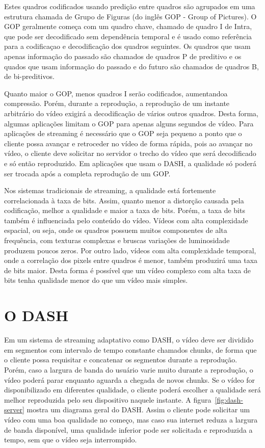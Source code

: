 Estes quadros codificados usando predição entre quadros são agrupados em uma estrutura chamada de Grupo de Figuras (do inglês GOP - Group of Pictures). O GOP geralmente começa com um quadro chave, chamado de quadro I de Intra, que pode ser decodificado sem dependência temporal e é usado como referência para a codificaçao e decodificação dos quadros seguintes. Os quadros que usam apenas informação do passado são chamados de quadros P de preditivo e os quados que usam informação do passado e do futuro são chamados de quadros B, de bi-preditivos.

Quanto maior o GOP, menos quadros I serão codificados, aumentandoa compressão. Porém, durante a reprodução, a reprodução de um instante arbitrário do vídeo exigirá a decodificação de vários outros quadros. Desta forma, algumas aplicações limitam o GOP para apenas alguns segundos de vídeo. Para aplicações de streaming é necessário que o GOP seja pequeno a ponto que o cliente possa avançar e retroceder no vídeo de forma rápida, pois ao avançar no vídeo, o cliente deve solicitar no servidor o trecho do vídeo que será decodificado e só então reproduzido. Em aplicações que usam o DASH, a qualidade só poderá ser trocada após a completa reprodução de um GOP.

Nos sistemas tradicionais de streaming, a qualidade está fortemente correlacionada à taxa de bits. Assim, quanto menor a distorção causada pela codificação, melhor a qualidade e maior a taxa de bits. Porém, a taxa de bits também é influenciada pelo conteúdo do vídeo. Vídeos com alta complexidade espacial, ou seja, onde os quadros possuem muitos componentes de alta frequência, com texturas complexas e bruscas variações de luminosidade produzem poucos zeros. Por outro lado, vídeos com alta complexidade temporal, onde a correlação dos pixels entre quadros é menor, também produzirá uma taxa de bits maior. Desta forma é possível que um vídeo complexo com alta taxa de bits tenha qualidade menor do que um vídeo mais simples.

\section{O DASH}


Em um sistema de streaming adaptativo como DASH, o vídeo deve ser dividido em segmentos com intervalo de tempo constante chamados chunks, de forma que o cliente possa requisitar e concatenar os segmentos durante a reprodução. Porém, caso a largura de banda do usuário varie muito durante a reprodução, o vídeo poderá parar enquanto aguarda a chegada de novos chunks. Se o vídeo for disponibilizado em diferentes qualidade, o cliente poderá escolher a qualidade será melhor reproduzida pelo seu dispositivo naquele instante. A figura~\ref{fig:dash-server} mostra um diagrama geral do DASH. Assim o cliente pode solicitar um vídeo com uma boa qualidade no começo, mas caso sua internet reduza a largura de banda disponível, uma qualidade inferior pode ser solicitada e reproduzida a tempo, sem que o vídeo seja interrompido.


